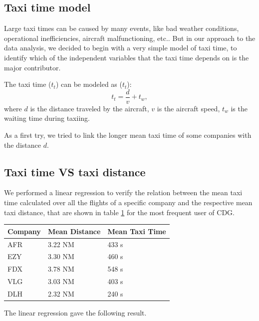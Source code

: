 \documentclass{article}
\begin{document}
\subsection{Taxi time model}

Large taxi times can be caused by many events, like bad weather conditions, operational inefficiencies, aircraft malfunctioning, etc.. But in our approach to the data analysis, we decided to begin with a very simple model of taxi time, to identify which of the independent variables that the taxi time depends on is the major contributor.

The taxi time ($t_t$) can be modeled as ($t_t$):
\begin{equation}\label{time-eq}
t_t = \frac{d}{v} + t_{w}, 
\end{equation}
where $d$ is the distance traveled by the aircraft, $v$ is the aircraft speed, $t_{w}$ is the waiting time during taxiing.

As a first try, we tried to link the longer mean taxi time of some companies with the distance $d$.

\subsection{Taxi time VS taxi distance}\label{regression}
We performed a linear regression to verify the relation between the mean taxi time calculated over all the flights of a specific company and the respective mean taxi distance, that are shown in table \ref{tableDistances} for the most frequent user of CDG.

\begin{table}[h!!!!!!!!!!!!!!!!!!!!!!]
\centering

\begin{tabular}{p{1.5cm}p{1.5cm}p{1.6cm}}\hline
	Company & Mean Distance & Mean Taxi Time\\ \hline
	AFR & 3.22 NM & 433 s \\
	EZY & 3.30 NM & 460 s\\
	FDX & 3.78 NM & 548 s\\ 
	VLG & 3.03 NM & 403 s\\
	DLH & 2.32 NM & 240 s\\
	\hline
\end{tabular}
\label{tableDistances}
\end{table}

The linear regression gave the following result.
\end{document}
